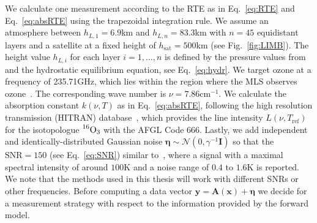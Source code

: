 We calculate one measurement according to the RTE as in Eq.~\ref{eq:RTE} and Eq.~\ref{eq:absRTE} using the trapezoidal integration rule.
We assume an atmosphere between $h_{L,1} = 6.9$km and $h_{L,n} = 83.3$km with $n = 45$ equidistant layers and a satellite at a fixed height of $h_{\text{sat}} = 500$km (see Fig.~\ref{fig:LIMB}).
The height value $h_{L,i}$ for each layer $i = 1,\dots, n$ is defined by the pressure values from~\cite{MLSdata} and the hydrostatic equilibrium equation, see Eq.~\ref{eq:hydr}.
We target ozone at a frequency of 235.71GHz, which lies within the region where the MLS observes ozone~\cite{livesey2008ozonecarbonmono, waters2006earth}.
The corresponding wave number is $\nu = 7.86\text{cm}^{-1}$.
We calculate the absorption constant $k(\nu,T)$ as in Eq.~\ref{eq:absRTE}, following the high resolution transmission (HITRAN) database~\cite{gordon2022hitran2020}, which provides the line intensity $L(\nu,T_{\text{ref}})$ for the isotopologue $\prescript{16}{}{\text{O}}_3$ with the AFGL Code 666.
Lastly, we add independent and identically-distributed Gaussian noise $\bm{\eta} \sim \mathcal{N}(0,\gamma^{-1} \bm{I})$ so that the $\text{SNR}=150$ (see Eq.~\ref{eq:SNR}) similar to~\cite{Froidevaux2008snrozone}, where a signal with a maximal spectral intensity of around $100\text{K}$ and a noise range of $0.4$ to $1.6\text{K}$ is reported.
We note that the methods used in this thesis will work with different SNRs or other frequencies.
Before computing a data vector $\bm{y} = \bm{A}(\bm{x}) + \bm{\eta} $ we decide for a measurement strategy with respect to the information provided by the forward model.


